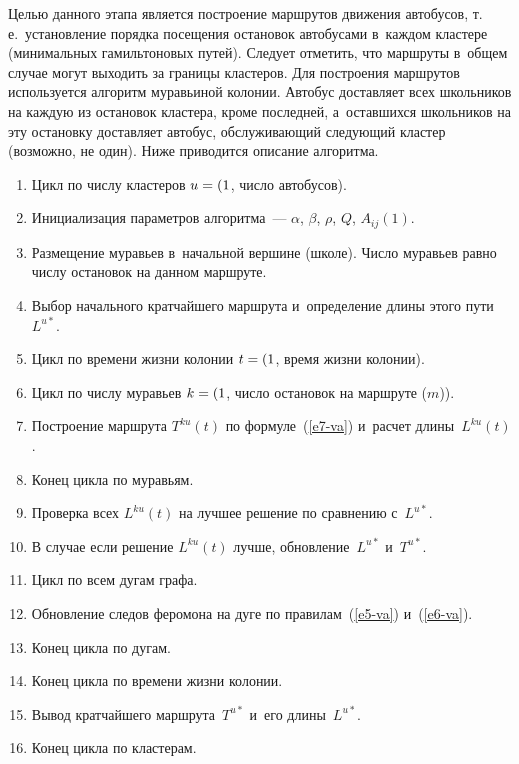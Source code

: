 \begin{multicols}{2}
     Целью данного этапа является построение маршрутов движения
автобусов, т.\,е.\
установление порядка посещения остановок автобусами
в~каж\-дом кластере (минимальных гамильтоновых путей). Следует отметить, что
маршруты в~общем случае могут выходить за границы кластеров. Для
по\-стро\-ения маршрутов используется алгоритм муравьиной колонии. Автобус
доставляет всех школьников на каждую из остановок кластера, кроме
последней, а~оставшихся школьников на эту остановку до\-став\-ля\-ет автобус,
обслуживающий следующий кластер (возможно, не один). Ниже приводится
описание алгоритма.
     \begin{enumerate}[1.]
\item Цикл по числу кластеров $u\hm= (1$, число автобусов).\\[-13.5pt]
\item Инициализация параметров алгоритма~--- $\alpha$, $\beta$, $\rho$,
$Q$, $A_{ij}(1)$.\\[-13.5pt]
\item Размещение муравьев в~начальной вершине (школе). Число
муравьев равно числу остановок на данном маршруте.\\[-13.5pt]
\item Выбор начального кратчайшего маршрута и~определение длины
этого пути~$L^{u*}$.\\[-13.5pt]
\item Цикл по времени жизни колонии $t\hm=(1$, время жизни колонии).\\[-13.5pt]
\item Цикл по числу муравьев $ k\hm = (1$, число остановок на маршруте
($m$)).\\[-13.5pt]
\item Построение маршрута $T^{ku}(t)$ по формуле~(\ref{e7-va}) и~расчет длины~$L^{ku}(t)$.\\[-13.5pt]
\item Конец цикла по муравьям.\\[-13.5pt]
\item Проверка всех $L^{ku}(t)$ на лучшее решение по сравнению
с~$L^{u*}$.\\[-13.5pt]
\item В случае если решение $L^{ku}(t)$ лучше, обновление~$L^{u*}$
и~$T^{u*}$.\\[-13.5pt]
\item Цикл по всем дугам графа.\\[-13.5pt]
\item Обновление следов феромона на дуге по правилам~(\ref{e5-va})
и~(\ref{e6-va}).\\[-13.5pt]
\item Конец цикла по дугам.\\[-13.5pt]
\item Конец цикла по времени жизни колонии.\\[-13.5pt]
\item Вывод кратчайшего маршрута~$T^{u*}$ и~его длины~$L^{u*}$.\\[-13.5pt]
\item Конец цикла по кластерам.
\end{enumerate}


\end{multicols}
